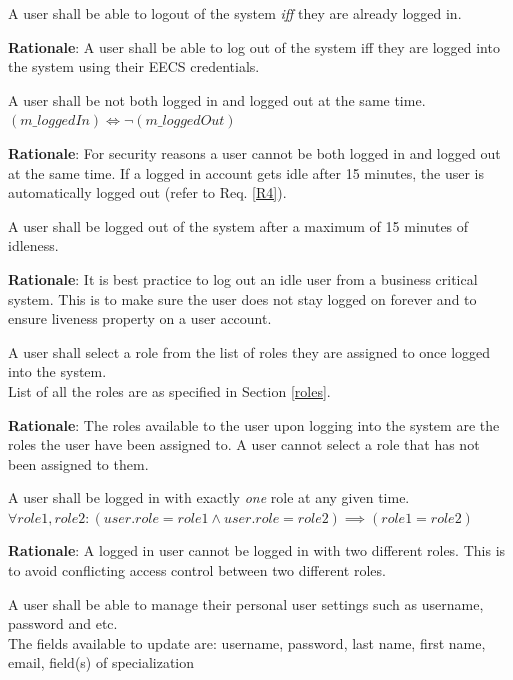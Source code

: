 \documentclass[fontsize=12pt,paper=letter,twoside]{scrartcl}
\begin{document}
\genreq
{A user shall be able to logout of the system \emph{iff} they are already logged in.\\}
{}
\label{R2}

\smallskip
\noindent \textbf{Rationale}: A user shall be able to log out of the system iff they are logged into the system using their EECS credentials.

\rdescription
{A user shall be not both logged in and logged out at the same time.\\}
{$(m\_loggedIn) \iff \neg (m\_loggedOut)$}
\label{R3}

\smallskip
\noindent \textbf{Rationale}: For security reasons a user cannot be both logged in and logged out at the same time. If a logged in account gets idle after 15 minutes, the user is automatically logged out (refer to Req. \ref{R4}).

\genreq
{A user shall be logged out of the system after a maximum of 15 minutes of idleness.\\}
{}
\label{R4}

\smallskip
\noindent \textbf{Rationale}: It is best practice to log out an idle user from a business critical system. This is to make sure the user does not stay logged on forever and to ensure liveness property on a user account.

\rdescription
{A user shall select a role from the list of roles they are assigned to once logged into the system.\\}
{List of all the roles are as specified in Section \ref{roles}.}
\label{R5}

\smallskip
\noindent \textbf{Rationale}: The roles available to the user upon logging into the system are the roles the user have been assigned to. A user cannot select a role that has not been assigned to them.

\rdescription
{A user shall be logged in with exactly \emph{one} role at any given time.\\}
{$\forall role1, role2 : (user.role = role1 \land user.role = role2) \implies (role1 = role2)$}
\label{R6}

\smallskip
\noindent \textbf{Rationale}: A logged in user cannot be logged in with two different roles. This is to avoid conflicting access control between two different roles.

\rdescription
{A user shall be able to manage their personal user settings such as username, password and etc.\\}
{The fields available to update are: username, password, last name, first name, email, field(s) of specialization}
\end{document}
